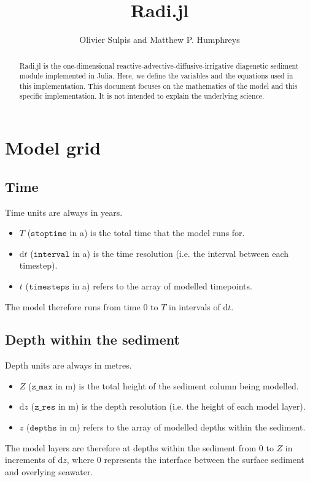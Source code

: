 \documentclass[a4paper]{article}
\newcommand{\D}[1]{\mathrm{d}#1}
\newcommand{\code}[1]{\texttt{#1}}
\begin{document}
\title{Radi.jl}
\author{Olivier Sulpis and Matthew P. Humphreys}

\maketitle

\begin{abstract}
Radi.jl is the one-dimensional reactive-advective-diffusive-irrigative diagenetic sediment module implemented in Julia.  Here, we define the variables and the equations used in this implementation.  This document focuses on the mathematics of the model and this specific implementation.  It is not intended to explain the underlying science.
\end{abstract}



\section{Model grid}

\subsection{Time}

Time units are always in years.
\begin{itemize}
  \item $T$ ($\code{stoptime}$ in a) is the total time that the model runs for.
  \item $\D{t}$ ($\code{interval}$ in a) is the time resolution (i.e. the interval between each timestep).
  \item $t$ ($\code{timesteps}$ in a) refers to the array of modelled timepoints.
\end{itemize}
The model therefore runs from time $0$ to $T$ in intervals of $\D{t}$.


\subsection{Depth within the sediment}

Depth units are always in metres.
\begin{itemize}
  \item $Z$ ($\code{z\_max}$ in m) is the total height of the sediment column being modelled.
  \item $\D{z}$ ($\code{z\_res}$ in m) is the depth resolution (i.e. the height of each model layer).
  \item $z$ ($\code{depths}$ in m) refers to the array of modelled depths within the sediment.
\end{itemize}
The model layers are therefore at depths within the sediment from $0$ to $Z$ in increments of $\D{z}$, where $0$ represents the interface between the surface sediment and overlying seawater.
\end{document}

